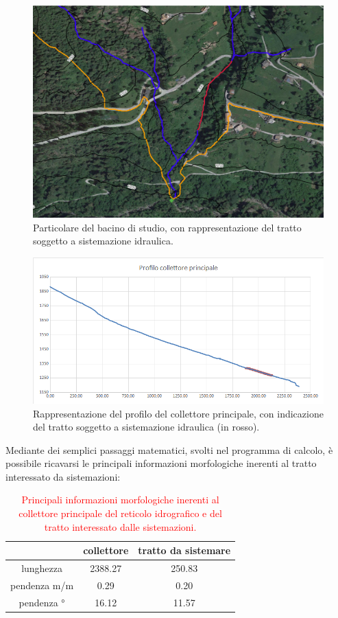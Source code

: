 \begin{figure}[H] \centering
    \includegraphics[scale=0.3]{immagini/pendenza_planimetria_2.png}
    \caption{Particolare del bacino di studio, con rappresentazione del tratto soggetto a sistemazione idraulica.}
    \label{pendenza_planimetria_2}
\end{figure}
\begin{figure}[H] \centering
    \includegraphics[scale=0.5]{immagini/pendenza_collettore.png}
    \caption{Rappresentazione del profilo del collettore principale, con indicazione del tratto soggetto a sistemazione idraulica (in rosso).}
    \label{pendenza_collettore}
\end{figure}
Mediante dei semplici passaggi matematici, svolti nel programma di calcolo, è possibile ricavarsi le principali informazioni morfologiche inerenti al tratto interessato da sistemazioni:
\begin{table}[H] \centering
    \caption{\textcolor{red}{Principali informazioni morfologiche inerenti al collettore principale del reticolo idrografico e del tratto interessato dalle sistemazioni.}}
    \begin{tabular}{ccc}
    \toprule
                 & collettore & tratto da sistemare \\
    \midrule
    lunghezza    & 2388.27    & 250.83              \\
    pendenza m/m & 0.29       & 0.20                \\
    pendenza °   & 16.12      & 11.57               \\
    \bottomrule
    \end{tabular}
    \label{inf_morf_coll_princ}
\end{table}

